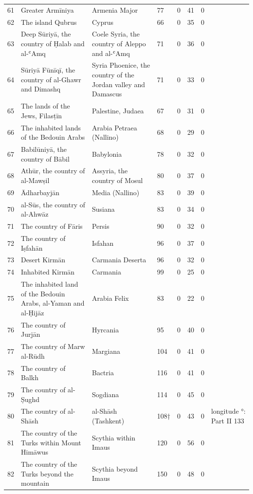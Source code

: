 {\begin{longtable}{R{8mm}L{42mm}L{34mm}R{7mm}R{6mm}R{6mm}R{6mm}L{24mm}}
61 & Greater Armīniya & Armenia Major & 77 & 0 & 41 & 0 & \\
62 & The island Qubrus & Cyprus & 66 & 0 & 35 & 0 & \\
63 & Deep Sūriyā, the country of Ḥalab and al-ʿAmq & Coele Syria, the country of Aleppo and al-ʿAmq & 71 & 0 & 36 & 0 & \\
64 & Sūriyā Fūnīqī, the country of al-Ghawr and Dimashq & Syria Phoenice, the country of the Jordan valley and Damascus & 71 & 0 & 33 & 0 & \\
65 & The lands of the Jews, Filasṭīn & Palestine, Judaea & 67 & 0 & 31 & 0 & \\
66 & The inhabited lands of the Bedouin Arabs & Arabia Petraea (Nallino) & 68 & 0 & 29 & 0 & \\
67 & Babilūniyā, the country of Bābil & Babylonia & 78 & 0 & 32 & 0 & \\
68 & Athūr, the country of al-Mawṣil & Assyria, the country of Mosul & 80 & 0 & 37 & 0 & \\
69 & Ādharbayjān & Media (Nallino) & 83 & 0 & 39 & 0 & \\
70 & al-Sūs, the country of al-Ahwāz & Susiana & 83 & 0 & 34 & 0 & \\
71 & The country of Fāris & Persis & 90 & 0 & 32 & 0 & \\
72 & The country of Iṣfahān & Isfahan & 96 & 0 & 37 & 0 & \\
73 & Desert Kirmān & Carmania Deserta & 96 & 0 & 32 & 0 & \\
74 & Inhabited Kirmān & Carmania & 99 & 0 & 25 & 0 & \\
75 & The inhabited land of the Bedouin Arabs, al-Yaman and al-Ḥijāz & Arabia Felix & 83 & 0 & 22 & 0 & \\
76 & The country of Jurjān & Hyrcania & 95 & 0 & 40 & 0 & \\
77 & The country of Marw al-Rūdh & Margiana & 104 & 0 & 41 & 0 & \\
78 & The country of Balkh & Bactria & 116 & 0 & 41 & 0 & \\
79 & The country of al-Ṣughd & Sogdiana & 114 & 0 & 45 & 0 & \\
80 & The country of al-Shāsh & al-Shāsh (Tashkent) & 108† & 0 & 43 & 0 & longitude °: Part II 133\\
81 & The country of the Turks within Mount Himāwus & Scythia within Imaus & 120 & 0 & 56 & 0 & \\
82 & The country of the Turks beyond the mountain & Scythia beyond Imaus & 150 & 0 & 48 & 0 & \\

\end{longtable}}
